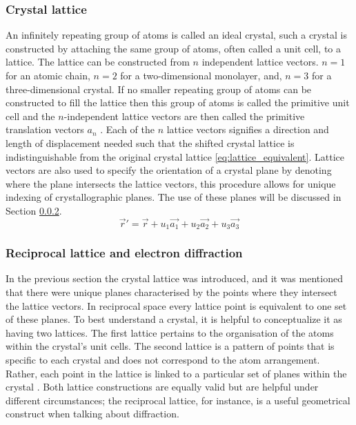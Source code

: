 \subsubsection{Crystal lattice}
An infinitely repeating group of atoms is called an ideal crystal, such a crystal is constructed by attaching the same group of atoms, often called a unit cell, to a lattice.
The lattice can be constructed from $n$ independent lattice vectors. $n=1$ for an atomic chain, $n=2$ for a two-dimensional monolayer, and, $n=3$ for a three-dimensional crystal.
If no smaller repeating group of atoms can be constructed to fill the lattice then this group of atoms is called the primitive unit cell and the $n$-independent lattice vectors are then called the primitive translation vectors $a_{n}$ \cite{Kittel1995-qt}.
Each of the $n$ lattice vectors signifies a direction and length of displacement needed such that the shifted crystal lattice is indistinguishable from the original crystal lattice \ref{eq:lattice_equivalent}.
Lattice vectors are also used to specify the orientation of a crystal plane by denoting where the plane intersects the lattice vectors, this procedure allows for unique indexing of crystallographic planes. The use of these planes will be discussed in Section \ref{sec:diffraction}.
\begin{equation}
    \vec{r}' = \vec{r} + u_1 \vec{a_1} +u_2 \vec{a_2} + u_3 \vec{a_3}
    \label{eq:lattice_equivalent}
\end{equation}

\subsubsection{Reciprocal lattice and electron diffraction}
\label{sec:diffraction}
In the previous section the crystal lattice was introduced, and it was mentioned that there were unique planes characterised by the points where they intersect the lattice vectors.
In reciprocal space every lattice point is equivalent to one set of these planes.
To best understand a crystal, it is helpful to conceptualize it as having two lattices. The first lattice pertains to the organisation of the atoms within the crystal's unit cells. The second lattice is a pattern of points that is specific to each crystal and does not correspond to the atom arrangement. Rather, each point in the lattice is linked to a particular set of planes within the crystal \cite{Williams2009-ww}.
Both lattice constructions are equally valid but are helpful under different circumstances; the reciprocal lattice, for instance, is a useful geometrical construct when talking about diffraction.

